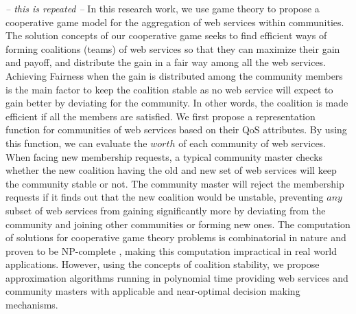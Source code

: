         \emph {-- this is repeated --} 
        In this research work, we use game theory to
        propose a cooperative game model for the aggregation of web
        services within communities. The solution concepts of our
        cooperative game seeks to find efficient ways of forming
        coalitions (teams) of web services so that they can maximize their
        gain and payoff, and distribute the gain in a fair way among all
        the web services. Achieving Fairness when the gain is distributed
        among the community members is the main factor to keep the
        coalition stable as no web service will expect to gain better by
        deviating for the community. In other words, the coalition is made
        efficient if all the members are satisfied. We first propose a
        representation function for communities of web services based on
        their QoS attributes. By using this function, we can evaluate the
        $worth$ of each community of web services. When facing new
        membership requests, a typical community master checks whether the
        new coalition having the old and new set of web services will keep
        the community stable or not. The community master will reject the
        membership requests if it finds out that the new coalition would
        be unstable, preventing $any$ subset of web services from gaining
        significantly more by deviating from the community and joining
        other communities or forming new ones. The computation of
        solutions for cooperative game theory problems is combinatorial in
        nature and proven to be NP-complete \cite{Algorithmic}, making
        this computation impractical in real world applications. However,
        using the concepts of coalition stability, we propose
        approximation algorithms running in polynomial time providing web
        services and community masters with applicable and near-optimal
        decision making mechanisms.





